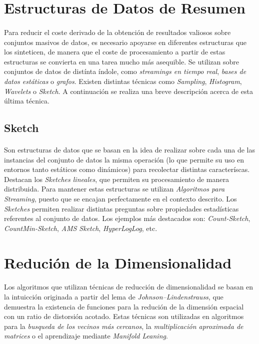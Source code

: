 \documentclass[a4paper]{article}
\begin{document}
  \section{Estructuras de Datos de Resumen}

    \paragraph{}
    Para reducir el coste derivado de la obtención de resultados valiosos sobre conjuntos masivos de datos, es necesario apoyarse en diferentes estructuras que los sinteticen, de manera que el coste de procesamiento a partir de estas estructuras se convierta en una tarea mucho más asequible. Se utilizan sobre conjuntos de datos de distínta índole, como \emph{streamings en tiempo real}, \emph{bases de datos estáticas} o \emph{grafos}. Existen distintas técnicas como \emph{Sampling}, \emph{Histogram}, \emph{Wavelets} o \emph{Sketch}. A continuación se realiza una breve descripción acerca de esta última técnica.

    \subsection{Sketch}

      \paragraph{}
      Son estructuras de datos que se basan en la idea de realizar sobre cada una de las instancias del conjunto de datos la misma operación (lo que permite su uso en entornos tanto estáticos como dinámicos) para recolectar distintas caracteríscas. Destacan los \emph{Sketches lineales}, que permiten su procesamiento de manera distribuida. Para mantener estas estructuras se utilizan \emph{Algoritmos para Streaming}, puesto que se encajan perfectamente en el contexto descrito. Los \emph{Sketches} permiten realizar distintas preguntas sobre propiedades estadísticas referentes al conjunto de datos. Los ejemplos más destacados son: \emph{Count-Sketch}, \emph{CountMin-Sketch}, \emph{AMS Sketch}, \emph{HyperLogLog}, etc.

  \section{Redución de la Dimensionalidad}

    \paragraph{}
    Los algoritmos que utilizan técnicas de reducción de dimensionalidad se basan en la intuicción originada a partir del lema de \emph{Johnson–Lindenstrauss}, que demuestra la existencia de funciones para la redución de la dimensión espacial con un ratio de distorsión acotado. Estas técnicas son utilizadas en algoritmos para la \emph{busqueda de los vecinos más cercanos}, la \emph{multiplicación aproximada de matrices} o el aprendizaje mediante \emph{Manifold Leaning}.
\end{document}
